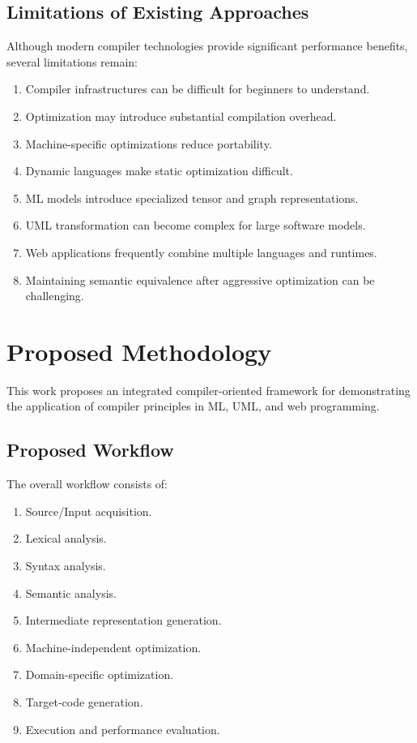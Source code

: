 \documentclass[12pt,a4paper]{article}
\begin{document}
\subsection{Limitations of Existing Approaches}

Although modern compiler technologies provide significant performance
benefits, several limitations remain:

\begin{enumerate}
    \item Compiler infrastructures can be difficult for beginners to
    understand.
    \item Optimization may introduce substantial compilation overhead.
    \item Machine-specific optimizations reduce portability.
    \item Dynamic languages make static optimization difficult.
    \item ML models introduce specialized tensor and graph representations.
    \item UML transformation can become complex for large software models.
    \item Web applications frequently combine multiple languages and runtimes.
    \item Maintaining semantic equivalence after aggressive optimization can be
    challenging.
\end{enumerate}

\newpage

\section{Proposed Methodology}

This work proposes an integrated compiler-oriented framework for demonstrating
the application of compiler principles in ML, UML, and web programming.

\subsection{Proposed Workflow}

The overall workflow consists of:

\begin{enumerate}
    \item Source/Input acquisition.
    \item Lexical analysis.
    \item Syntax analysis.
    \item Semantic analysis.
    \item Intermediate representation generation.
    \item Machine-independent optimization.
    \item Domain-specific optimization.
    \item Target-code generation.
    \item Execution and performance evaluation.
\end{enumerate}
\end{document}
